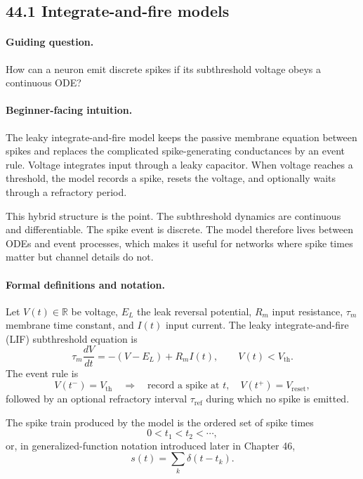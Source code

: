 \subsection{44.1 Integrate-and-fire models}

\paragraph{Guiding question.}
How can a neuron emit discrete spikes if its subthreshold voltage obeys a continuous ODE?

\paragraph{Beginner-facing intuition.}
The leaky integrate-and-fire model keeps the passive membrane equation between spikes and replaces the complicated spike-generating conductances by an event rule. Voltage integrates input through a leaky capacitor. When voltage reaches a threshold, the model records a spike, resets the voltage, and optionally waits through a refractory period.

This hybrid structure is the point. The subthreshold dynamics are continuous and differentiable. The spike event is discrete. The model therefore lives between ODEs and event processes, which makes it useful for networks where spike times matter but channel details do not.

\paragraph{Formal definitions and notation.}
Let \(V(t)\in\mathbb{R}\) be voltage, \(E_L\) the leak reversal potential, \(R_m\) input resistance, \(\tau_m\) membrane time constant, and \(I(t)\) input current. The leaky integrate-and-fire (LIF) subthreshold equation is
\[
\tau_m\frac{dV}{dt}=-(V-E_L)+R_m I(t),
\qquad V(t)<V_{\mathrm{th}}.
\]
The event rule is
\[
V(t^-)=V_{\mathrm{th}}
\quad\Longrightarrow\quad
\text{record a spike at }t,\quad V(t^+)=V_{\mathrm{reset}},
\]
followed by an optional refractory interval \(\tau_{\mathrm{ref}}\) during which no spike is emitted.

The spike train produced by the model is the ordered set of spike times
\[
0<t_1<t_2<\cdots,
\]
or, in generalized-function notation introduced later in Chapter 46,
\[
s(t)=\sum_k\delta(t-t_k).
\]

